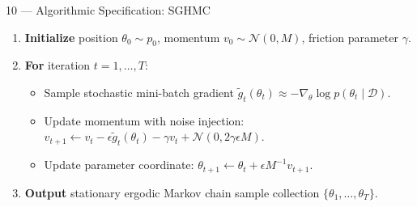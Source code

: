 \documentclass[aspectratio=169,10pt]{beamer}
\begin{document}
\begin{frame}{10 — Algorithmic Specification: SGHMC}
  \begin{tcolorbox}[enhanced,arc=1.2mm,boxrule=.4pt,colback=white,colframe=BayesBorder,borderline west={2.2pt}{0pt}{BayesTeal},title={Algorithm: Stochastic Gradient Hamiltonian Monte Carlo},coltitle=BayesTeal,fonttitle=\bfseries]
    \begin{enumerate}\setlength{\itemsep}{.08cm}\small
      \item \textbf{Initialize} position $\theta_0 \sim p_0$, momentum $v_0 \sim \mathcal{N}(0, M)$, friction parameter $\gamma$.
      \item \textbf{For} iteration $t = 1, \dots, T$:
        \begin{itemize}\footnotesize
          \item Sample stochastic mini-batch gradient $\tilde{g}_t(\theta_t) \approx -\nabla_\theta \log p(\theta_t \mid \mathcal{D})$.
          \item Update momentum with noise injection: $v_{t+1} \leftarrow v_t - \epsilon \tilde{g}_t(\theta_t) - \gamma v_t + \mathcal{N}(0, 2\gamma \epsilon M)$.
          \item Update parameter coordinate: $\theta_{t+1} \leftarrow \theta_t + \epsilon M^{-1} v_{t+1}$.
        \end{itemize}
      \item \textbf{Output} stationary ergodic Markov chain sample collection $\{\theta_1, \dots, \theta_T\}$.
    \end{enumerate}
  \end{tcolorbox}
  \vfill
\end{frame}
\end{document}
